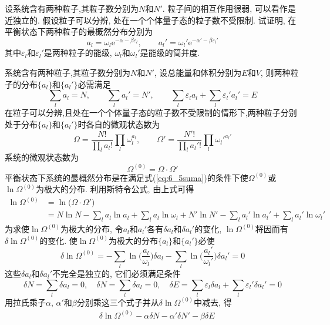 \begin{problem}[6.5]
设系统含有两种粒子,其粒子数分别为$N$和$N'$. 粒子间的相互作用很弱, 可以看作是近独立的. 假设粒子可以分辨, 处在一个个体量子态的粒子数不受限制. 试证明, 在平衡状态下两种粒子的最概然分布分别为
\[
a_l = \omega_l \mathrm{e}^{-\alpha - \beta \varepsilon_l},\qquad
a_l' = \omega_l' \mathrm{e}^{-\alpha' - \beta \varepsilon_l'}
\]
其中$\varepsilon_l$和$\varepsilon_l'$是两种粒子的能级, $\omega_l$和$\omega_l'$是能级的简并度.
\end{problem}
\begin{solution}
系统含有两种粒子,其粒子数分别为$N$和$N'$, 设总能量和体积分别为$E$和$V$, 则两种粒子的分布$\{a_l\}$和$\{a_l'\}$必需满足
\begin{equation}\label{eq:6_5suma}
\sum_l a_l  = N , \qquad
\sum_l a_l' = N', \qquad
\sum_l \varepsilon_l a_l + \sum_l \varepsilon_l' a_l' = E 
\end{equation}
在粒子可以分辨,且处在一个个体量子态的粒子数不受限制的情形下,两种粒子分别处于分布$\{a_l\}$和$\{a_l'\}$时各自的微观状态数为
\[
\Omega  = \frac{N!}{\prod\limits_l a_l !} \prod\limits_l \omega_l^{a_l},\qquad
\Omega' = \frac{N'!}{\prod\limits_l a_l' !} \prod\limits_l \omega_l'^{a_l'}
\]
系统的微观状态数为
\[
\Omega^{(0)} = \Omega\cdot\Omega'
\]
平衡状态下系统的最概然分布是在满足式(\ref{eq:6_5suma})的条件下使$\Omega^{(0)}$或$\ln\Omega^{(0)}$为极大的分布. 利用斯特令公式, 由上式可得
\begin{align*}
\ln\Omega^{(0)} & =\ln\big(\Omega\cdot\Omega'\big)\\
 & =N\ln N-\sum_{l}a_{l}\ln a_{l}+\sum_{l}a_{l}\ln\omega_{l}+N'\ln N'-\sum_{l}a_{l}'\ln a_{l}'+\sum_{l}a_{l}'\ln\omega_{l}'
\end{align*}
为求使$\ln\Omega^{(0)}$为极大的分布, 令$a_l$和$a_l'$各有$\delta a_l$和$\delta a_l'$的变化, $\ln\Omega^{(0)}$将因而有$\delta \ln\Omega^{(0)}$的变化. 使$\ln\Omega^{(0)}$为极大的分布$\{a_l\}$和$\{a_l'\}$必使
\[
\delta \ln \Omega^{(0)} = -\sum_l \ln\bigg(\frac{a_l}{\omega_l}\bigg)\delta a_l - \sum_l \ln\bigg(\frac{a_l'}{\omega_l'}\bigg)\delta a_l'
= 0
\]
这些$\delta a_l$和$\delta a_l'$不完全是独立的, 它们必须满足条件
\[
\delta N = \sum_l\delta a_l = 0,\quad
\delta N = \sum_l\delta a_l = 0,\quad
\delta E = \sum_l\varepsilon_l \delta a_l + \sum_l \varepsilon_l' \delta a_l' = 0
\]
用拉氏乘子$\alpha$, $\alpha'$和$\beta$分别乘这三个式子并从$\delta\ln\Omega^{(0)}$中减去, 得
\begin{align*}
  & ~\delta\ln\Omega^{(0)}-\alpha\delta N-\alpha'\delta N'-\beta\delta E\\

\end{align*}
\end{solution}
